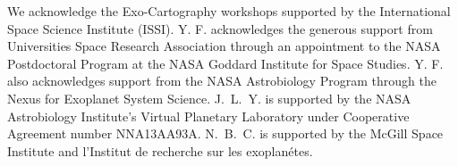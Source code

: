 \documentclass[iop,numberedappendix,apj]{emulateapj}
\begin{document}
\acknowledgements

We acknowledge the Exo-Cartography workshops supported by the International Space Science Institute (ISSI). 
Y. F. acknowledges the generous support from Universities Space Research Association through an appointment to the NASA Postdoctoral Program at the NASA Goddard Institute for Space Studies. 
Y. F. also acknowledges support from the NASA Astrobiology Program through the Nexus for Exoplanet System Science. 
J.~L.~Y. is supported by the NASA Astrobiology Institute's Virtual Planetary Laboratory under Cooperative Agreement number NNA13AA93A. 
N.~B.~C. is supported by the McGill Space Institute and l'Institut de recherche sur les exoplan\'etes.  


\end{document}
